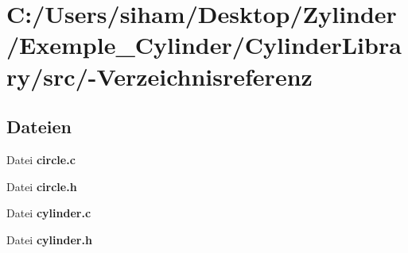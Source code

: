 \section{C:/Users/siham/Desktop/Zylinder/Exemple\_\-Cylinder/Cylinder\-Library/src/-Verzeichnisreferenz}
\label{dir_C_3A_2FUsers_2Fsiham_2FDesktop_2FZylinder_2FExemple_5FCylinder_2FCylinderLibrary_2Fsrc_2F}


\subsection*{Dateien}
\begin{CompactItemize}
\item 
Datei {\bf circle.c}
\item 
Datei {\bf circle.h}
\item 
Datei {\bf cylinder.c}
\item 
Datei {\bf cylinder.h}
\end{CompactItemize}
